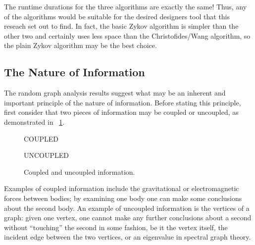The runtime durations for the three algorithms are exactly the same!  Thus, any of the algorithms would be suitable
for the desired designers tool that this reseach set out to find.  In fact, the basic Zykov algorithm is simpler
than the other two and certainly uses less space than the Christofides/Wang algorithm, so the plain Zykov algorithm
may be the best choice.

\subsection{The Nature of Information}\label{sec:sub:info}

The random graph analysis results suggest what may be an inherent and important principle of the nature of
information.  Before stating this principle, first consider that two pieces of information may be coupled or
uncoupled, as demonstrated in \figurename~\ref{fig:info}.

\begin{figure}[H]
  \begin{minipage}{2.5in}
    \centering

    COUPLED
  \end{minipage}
  \begin{minipage}{2.5in}
    \centering

    UNCOUPLED
  \end{minipage}
  \caption{Coupled and uncoupled information.}
  \label{fig:info}
\end{figure}

Examples of coupled information include the gravitational or electromagnetic forces between bodies; by examining
one body one can make some conclusions about the second body.  An example of uncoupled information is the vertices
of a graph: given one vertex, one cannot make any further conclusions about a second without ``touching'' the
second in some fashion, be it the vertex itself, the incident edge between the two vertices, or an eigenvalue in
spectral graph theory.

